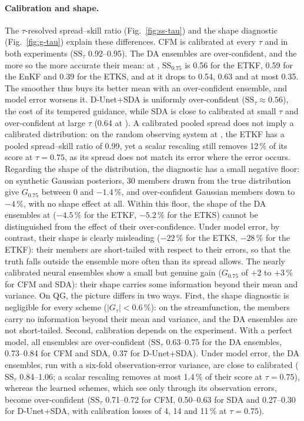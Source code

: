 \paragraph{Calibration and shape.}
The $\tau$-resolved spread--skill ratio (Fig.~\ref{fig:ss-tau}) and the shape diagnostic (Fig.~\ref{fig:g-tau}) explain these differences. CFM is calibrated at every $\tau$ and in both experiments
    ($\mathrm{SS}_\tau$ 0.92--0.95). The DA ensembles are over-confident, and the more so
    the more accurate their mean: at \Sz{}, $\mathrm{SS}_{0.75}$ is 0.56 for the ETKF,
    0.59 for the EnKF and 0.39 for the ETKS, and at \So{} it drops to 0.54, 0.63 and at
    most 0.35. The smoother thus buys its better mean with an over-confident ensemble, and
    model error worsens it. D-Unet+SDA is uniformly over-confident ($\mathrm{SS}_\tau
    \approx 0.56$), the cost of its tempered guidance, while SDA is close to calibrated at
    small $\tau$ and over-confident at large $\tau$ (0.64 at \Sz). A calibrated pooled
    spread does not imply a calibrated distribution: on the random observing system at
    \So, the ETKF has a pooled spread--skill ratio of 0.99, yet a scalar rescaling still
    removes 12\,\% of its score at $\tau = 0.75$, as its spread does not match its error
    where the error occurs. Regarding the shape of the distribution, the diagnostic has a
    small negative floor: on synthetic Gaussian posteriors, 30 members drawn from the true
    distribution give $G_{0.75}$ between $0$ and $-1.4\,\%$, and over-confident Gaussian
    members down to $-4\,\%$, with no shape effect at all. Within this floor, the shape
    of the DA ensembles at \Sz{} ($-4.5\,\%$ for the ETKF, $-5.2\,\%$ for the ETKS) cannot
    be distinguished from the effect of their over-confidence. Under model error, by
    contrast, their shape is clearly misleading ($-22\,\%$ for the ETKS, $-28\,\%$ for the
    ETKF): their members are short-tailed with respect to their errors, so that the truth
    falls outside the ensemble more often than its spread allows. The nearly calibrated
    neural ensembles show a small but genuine gain ($G_{0.75}$ of $+2$ to $+3\,\%$ for CFM
    and SDA): their shape carries some information beyond their mean and variance.
On QG, the picture differs in two ways. First, the shape diagnostic is negligible for every
scheme ($|G_\tau| < 0.6\,\%$): on the streamfunction, the members carry no information
beyond their mean and variance, and the DA ensembles are not short-tailed. Second,
calibration depends on the experiment. With a perfect model, all ensembles are
over-confident ($\mathrm{SS}_\tau$ 0.63--0.75 for the DA ensembles, 0.73--0.84 for CFM and
SDA, 0.37 for D-Unet+SDA). Under model error, the DA ensembles, run with a six-fold
observation-error variance, are close to calibrated ($\mathrm{SS}_\tau$ 0.84--1.06; a scalar
rescaling removes at most 1.4\,\% of their score at $\tau = 0.75$), whereas the learned
schemes, which see \So{} only through its observation errors, become over-confident
($\mathrm{SS}_\tau$ 0.71--0.72 for CFM, 0.50--0.63 for SDA and 0.27--0.30 for D-Unet+SDA,
with calibration losses of 4, 14 and 11\,\% at $\tau = 0.75$). 


